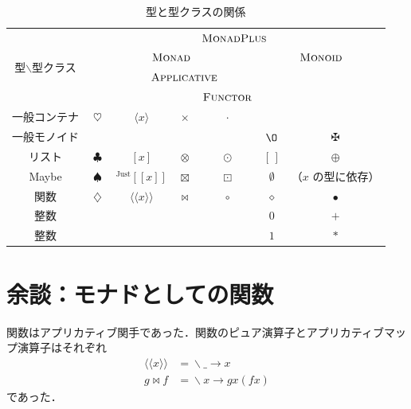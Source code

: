 \documentclass[a5paper,twoside,fleqn,draft]{jsbook}
\def\[{\left[\!\left[}
\def\]{\right]\!\right]}
\newcommand{\Langle}{\langle\!\langle}
\newcommand{\Rangle}{\rangle\!\rangle}
\newcommand{\mEmptyList}{{[\,]}}
\newcommand{\mNothing}{\emptyset}
\newcommand{\mZero}{\O}
\newcommand{\mAnyParam}{\_}
\newcommand{\mAnonParam}{\diamond}
\DeclareMathOperator{\mAppend}{\oplus}
\DeclareMathOperator{\mAppMap}{\times}
\DeclareMathOperator{\mAppMapFunc}{\bowtie}
\DeclareMathOperator{\mAppMapList}{\otimes}
\DeclareMathOperator{\mAppMapMaybe}{\boxtimes}
\DeclareMathOperator{\mBind}{\heartsuit}
\DeclareMathOperator{\mBindFunc}{\diamondsuit}
\DeclareMathOperator{\mBindList}{\clubsuit}
\DeclareMathOperator{\mBindMaybe}{\spadesuit}
\DeclareMathOperator{\mComp}{\bullet} %
\DeclareMathOperator{\mLambda}{\backslash}
\DeclareMathOperator{\mLambdaArrow}{\rightarrow}
\DeclareMathOperator{\mMap}{\cdot} %
\DeclareMathOperator{\mMapFunc}{\circ}
\DeclareMathOperator{\mMapList}{\odot}
\DeclareMathOperator{\mMapMaybe}{\boxdot}
\DeclareMathOperator{\mPlus}{\maltese}
\newcommand{\mValueConstructor}[1]{\mathrm{#1}}
\newcommand{\mGenericValueAssemble}[2]{{}^\mValueConstructor{#1}\[#2\]}
\newcommand{\mJustWith}[1]{\mGenericValueAssemble{Just}{#1}}
\newcommand{\mFuncWith}[1]{\Langle#1\Rangle}
\newcommand{\mListWith}[1]{\left[#1\right]}
\newcommand{\mPureWith}[1]{\langle#1\rangle}
\newcommand{\mGenericTypeClass}[1]{\textsc{#1}} %
\newcommand{\mApplicativeTypeClass}{\mGenericTypeClass{Applicative}}
\newcommand{\mFunctorTypeClass}{\mGenericTypeClass{Functor}}
\newcommand{\mMonadTypeClass}{\mGenericTypeClass{Monad}}
\newcommand{\mMonadPlusTypeClass}{\mGenericTypeClass{MonadPlus}}
\newcommand{\mMonoidTypeClass}{\mGenericTypeClass{Monoid}}
\newcommand{\mLambdaExp}[2]{\mLambda{#1}\mLambdaArrow{#2}}
\begin{document}
\begin{table}
\label{tab:monadplus}
\caption{型と型クラスの関係}
\begin{center}
\begin{tabular}{||c||c|c|c|c|c|c||}
\hline
\multirow{4}{*}{型$\backslash$型クラス}
  &\multicolumn{6}{|c||}{$\mMonadPlusTypeClass$}\\
\cline{2-7}
\multirow{3}{*}{}
  &\multicolumn{4}{|c|}{$\mMonadTypeClass$}
  &\multicolumn{2}{|c||}{$\mMonoidTypeClass$}\\
\cline{3-5}
\multirow{2}{*}{}
  &
  &\multicolumn{3}{|c|}{$\mApplicativeTypeClass$}
  &\multicolumn{2}{|c||}{}\\
\cline{5-5}
\multirow{1}{*}{}
  &
  &\multicolumn{2}{|c|}{}
  &$\mFunctorTypeClass$
  &\multicolumn{2}{|c||}{}\\
\hline\hline
一般コンテナ
  &$\mBind$
  &$\mPureWith{x}$
  &$\mAppMap$
  &$\mMap$
  &
  &\\
\hline
一般モノイド
  &
  &
  &
  &
  &$\mZero$
  &$\mPlus$\\
\hline
リスト
  &$\mBindList$
  &$\mListWith{x}$
  &$\mAppMapList$
  &$\mMapList$
  &$\mEmptyList$
  &$\mAppend$\\
\hline
Maybe
  &$\mBindMaybe$
  &$\mJustWith{x}$
  &$\mAppMapMaybe$
  &$\mMapMaybe$
  &$\mNothing$
  &（$x$ の型に依存）\\
\hline
関数
  &$\mBindFunc$
  &$\mFuncWith{x}$
  &$\mAppMapFunc$
  &$\mMapFunc$
  &$\mAnonParam$
  &$\mComp$\\
\hline
整数
  &
  &
  &
  &
  &$0$
  &$+$\\
\hline
整数
  &
  &
  &
  &
  &$1$
  &$*$\\
\hline
\end{tabular}
\end{center}
\end{table}

\section{余談：モナドとしての関数}

関数はアプリカティブ関手であった．関数のピュア演算子とアプリカティブマッ
プ演算子はそれぞれ
\begin{align}
\mFuncWith{x}&=\mLambdaExp{\mAnyParam}{x}\\
g\mAppMapFunc f&=\mLambdaExp{x}{gx(fx)}
\end{align}
であった．
\end{document}
